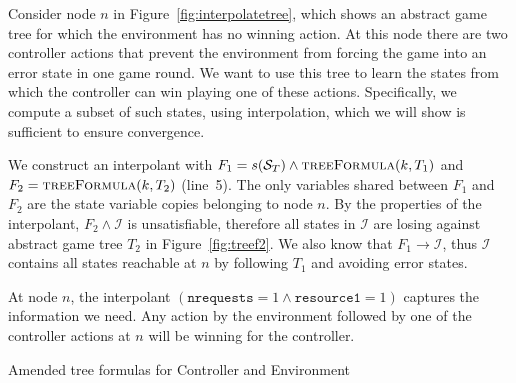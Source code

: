 Consider node $n$ in Figure~\ref{fig:interpolatetree}, which shows an abstract game tree for which the environment has no winning action. At this node there are two controller actions that prevent the environment from forcing the game into an error state in one game round. We want to use this tree to learn the states from which the controller can win playing one of these actions. Specifically, we compute a subset of such states, using interpolation, which we will show is sufficient to ensure convergence.

We construct an interpolant with $F_1 = s(\mathcal{S}_T) \land \textsc{treeFormula}(k, T_1)$ and $F_2 = \textsc{treeFormula}(k, T_2)$ (line~5). The only variables shared between $F_1$ and $F_2$ are the state variable copies belonging to node $n$. By the properties of the interpolant, $F_2 \land \mathcal{I}$ is unsatisfiable, therefore all states in $\mathcal{I}$ are losing against abstract game tree $T_2$ in Figure~\ref{fig:treef2}.  We also know that $F_1 \to \mathcal{I}$, thus $\mathcal{I}$ contains all states reachable at $n$ by following $T_1$ and avoiding error states.  

At node $n$, the interpolant $(\texttt{nrequests} = 1 \land
\texttt{resource1} = 1)$ captures the information we need. Any action by the
environment followed by one of the controller actions at $n$ will be
winning for the controller.

\begin{algorithm}[t] \caption{Amended tree formulas for Controller and
    Environment} \label{alg:unboundedTreeFormula} \begin{algorithmic}[1]
          \State
         \Else \State {} \EndIf
        \EndFunction {} \end{algorithmic}

    \begin{algorithmic}[1]
        \State {}
        \Else
        \State {}
        \EndIf
        \EndFunction
    \end{algorithmic}
\end{algorithm}

